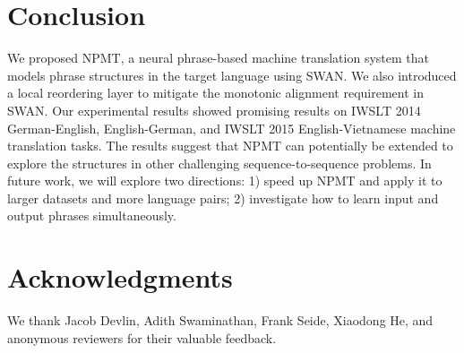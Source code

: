 \documentclass{article}
\begin{document}
{\section{Conclusion}
\label{sec:conclusion}
We proposed NPMT, a neural phrase-based machine translation system that models
phrase structures in the target language using SWAN. We also introduced a local
reordering layer to mitigate the monotonic alignment requirement in SWAN.  Our
experimental results showed promising results on IWSLT 2014 German-English,
English-German, and IWSLT 2015 English-Vietnamese machine translation tasks. 
The results suggest that NPMT can potentially be extended to explore the structures in other challenging sequence-to-sequence problems.
In future work, we will explore two directions: 1) speed up NPMT and apply it to larger datasets
and more language pairs; 2) investigate how to learn input and output phrases
simultaneously.



\section{Acknowledgments}
We thank Jacob Devlin, Adith Swaminathan, Frank Seide, Xiaodong He, and anonymous reviewers for their valuable feedback. 






\clearpage
\appendix

}
\end{document}
